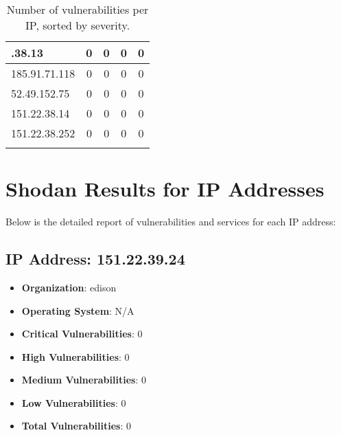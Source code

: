 \documentclass{article}
\begin{document}
\begin{longtable}{|>{\raggedright\arraybackslash}p{3cm}|c|c|c|c|}
    151.22.38.13 & 0 & 0 & 0 & 0 \\
    \hline
    
    
    \rowcolor{lightgreen} %
    
    185.91.71.118 & 0 & 0 & 0 & 0 \\
    \hline
    
    
    \rowcolor{lightgreen} %
    
    52.49.152.75 & 0 & 0 & 0 & 0 \\
    \hline
    
    
    \rowcolor{lightgreen} %
    
    151.22.38.14 & 0 & 0 & 0 & 0 \\
    \hline
    
    
    \rowcolor{lightgreen} %
    
    151.22.38.252 & 0 & 0 & 0 & 0 \\
    \hline
    
    \caption{Number of vulnerabilities per IP, sorted by severity.} \\
\end{longtable}

\section*{Shodan Results for IP Addresses}

Below is the detailed report of vulnerabilities and services for each IP address:



\subsection*{IP Address: 151.22.39.24}

\begin{itemize}
    \item \textbf{Organization}: edison
    \item \textbf{Operating System}:  N/A 
    \item \textbf{Critical Vulnerabilities}: 0
    \item \textbf{High Vulnerabilities}: 0
    \item \textbf{Medium Vulnerabilities}: 0
    \item \textbf{Low Vulnerabilities}: 0
    \item \textbf{Total Vulnerabilities}: 0
\end{itemize}
\end{document}
